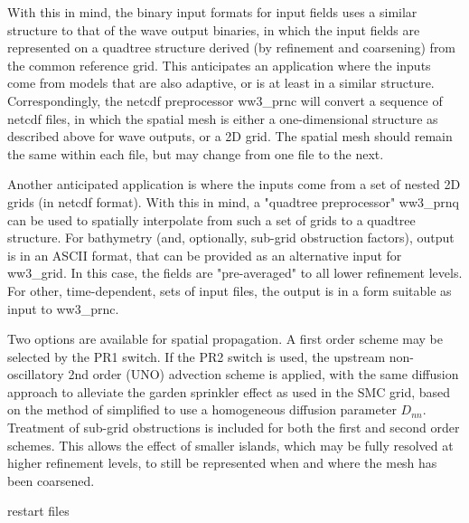 With this in mind, the binary input formats for input fields uses a similar 
structure to that of the wave output binaries, in which the input fields are 
represented on a quadtree structure derived (by refinement and coarsening) from the common reference grid. This anticipates an application where the inputs 
come from models that are also adaptive, or is at least in a similar
structure. Correspondingly, the netcdf 
preprocessor {\code ww3_prnc} will convert a sequence of netcdf files, 
in which the spatial mesh is either a one-dimensional structure as 
described above for wave outputs, or a 2D grid. The spatial mesh should 
remain the same within each file, but may change from one file to the next.

Another anticipated application is where the inputs come from a set of nested 
2D grids (in netcdf format). With this in mind, a "quadtree preprocessor" 
{\code ww3_prnq} can be used to spatially interpolate from such a set of 
grids to a quadtree structure. For bathymetry (and, optionally, sub-grid
obstruction factors), output is in an ASCII format, that can be provided as 
an alternative input for {\code ww3_grid}. In this case, the fields are
"pre-averaged" to all lower refinement levels. For other, time-dependent, 
sets of input files, the output is in a form suitable as input to 
{\code ww3_prnc}. 

Two options are available for spatial propagation. A first order scheme 
may be selected by the {\code PR1} switch. If the {\code PR2} switch is used,  the upstream non-oscillatory 2nd order (UNO) advection scheme \citep{art:Li08} 
is applied, with the same diffusion approach to alleviate the garden 
sprinkler effect as used in the SMC grid, based on the method of \cite{art:BH87}simplified to use a homogeneous diffusion parameter $D_{nn}$. Treatment 
of sub-grid obstructions is included for both the first and second order 
schemes. This allows the effect of smaller islands, which may be fully 
resolved at higher refinement levels, to still be represented when and 
where the mesh has been coarsened.

restart files

